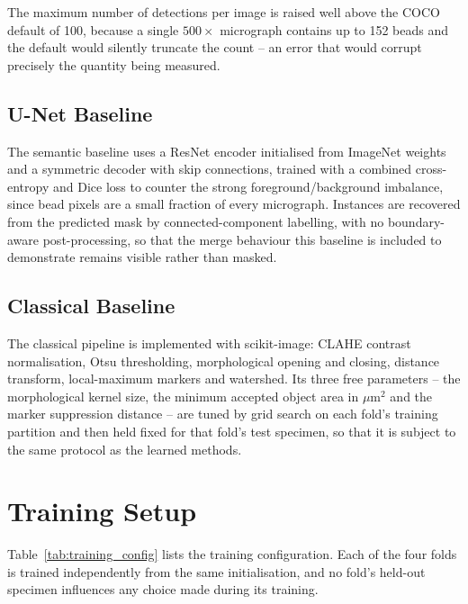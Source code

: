 The maximum number of detections per image is raised well above the COCO default of
100, because a single $500\times$ micrograph contains up to 152 beads and the default
would silently truncate the count -- an error that would corrupt precisely the
quantity being measured.

\subsection{U-Net Baseline}

The semantic baseline uses a ResNet encoder initialised from ImageNet weights and a
symmetric decoder with skip connections, trained with a combined cross-entropy and
Dice loss to counter the strong foreground/background imbalance, since bead pixels
are a small fraction of every micrograph. Instances are recovered from the predicted
mask by connected-component labelling, with no boundary-aware post-processing, so
that the merge behaviour this baseline is included to demonstrate remains visible
rather than masked.

\subsection{Classical Baseline}

The classical pipeline is implemented with scikit-image: CLAHE contrast
normalisation, Otsu thresholding, morphological opening and closing, distance
transform, local-maximum markers and watershed. Its three free parameters -- the
morphological kernel size, the minimum accepted object area in $\mu$m$^2$ and the
marker suppression distance -- are tuned by grid search on each fold's training
partition and then held fixed for that fold's test specimen, so that it is subject to
the same protocol as the learned methods.

\section{Training Setup}

Table~\ref{tab:training_config} lists the training configuration. Each of the four
folds is trained independently from the same initialisation, and no fold's held-out
specimen influences any choice made during its training.

